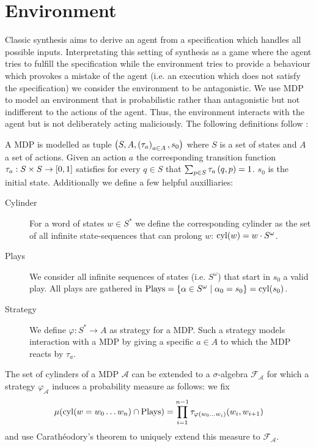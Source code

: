 \chapter{Environment}
Classic synthesis aims to derive an agent from a specification which handles
all possible inputs. Interpretating this setting of synthesis as a game where
the agent tries to fulfill the specification while the environment tries to
provide a behaviour which provokes a mistake of the agent (i.e. an execution
which does not satisfy the specification) we consider the environment to be
antagonistic. We use \ac{MDP} to model an environment that is probabilistic
rather than antagonistic but not indifferent to the actions of the agent. Thus,
the environment interacts with the agent but is not deliberately acting
maliciously. The following definitions follow \cite{RandAutoInfTrees}:

\begin{definition}
  A \acl*{MDP} is modelled as tuple
  $\left(S, A, \left(\tau_{a}\right)_{a\in A}, s_{0}\right)$ where $S$ is a set of states
  and $A$ a set of actions. Given an action $a$ the corresponding transition
  function $\tau_{a}:S\times S\rightarrow \left[0,1\right]$ satisfies for every
  $q\in S$ that $\sum_{p\in S}\tau_{a}\left(q,p\right) = 1$.
  $s_{0}$ is the initial state. Additionally we define a few helpful
  auxilliaries:
  \begin{description}
    \item [Cylinder] For a word of states $w\in S^{*}$ we define the
      corresponding cylinder as the set of all infinite state-sequences
      that can prolong $w$: $\operatorname{cyl}(w) = w\cdot S^{\omega}$.
    \item [Plays] We consider all infinite sequences of states
      (i.e. $S^{\omega}$) that start in $s_{0}$ a valid play. All plays
      are gathered in $\operatorname{Plays} = \left\{
        \alpha\in S^{\omega}\mid \alpha_{0} = s_{0}\right\} = \operatorname{cyl}(s_{0})$.
    \item [Strategy] We define $\varphi:S^{*}\rightarrow A$ as strategy for
      a \ac{MDP}. Such a strategy models interaction with a \ac{MDP} by
      giving a specific $a\in A$ to which the \ac{MDP} reacts by $\tau_{a}$.
  \end{description}
\end{definition}

The set of cylinders of a \ac{MDP} $\mathcal{A}$ can be extended to a
$\sigma$-algebra $\mathcal{F}_{\mathcal{A}}$ for which a strategy
$\varphi_{\mathcal{A}}$ induces a probability measure as follows: we fix
\begin{equation}
\mu(\operatorname{cyl}(w = w_{0}\dots w_{n})\cap\operatorname{Plays}) = 
\prod_{i=1}^{n-1}\tau_{\varphi(w_{0}\dots w_{i})}(w_{i}, w_{i+1})
\end{equation}
and use Carath\'eodory's theorem to uniquely extend this measure to
$\mathcal{F}_{\mathcal{A}}$.

